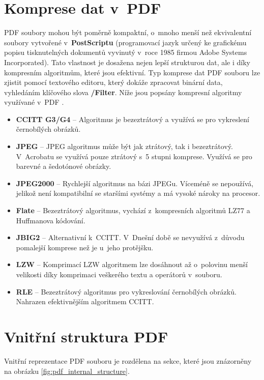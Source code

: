 \section{Komprese dat v~PDF}
\label{sec:komprese}
PDF soubory mohou být poměrně kompaktní, o~mnoho menší než ekvivalentní soubory vytvořené v~\textbf{PostScriptu} (programovací jazyk určený ke grafickému popisu tisknutelných dokumentů vyvinutý v~roce 1985 firmou Adobe Systems Incorporated). Tato vlastnost je dosažena nejen lepší strukturou dat, ale i díky kompresním algoritmům, které jsou efektivní. Typ komprese dat PDF souboru lze zjistit pomocí textového editoru, který dokáže zpracovat binární data, vyhledáním klíčového slova \textbf{/Filter}. Níže jsou popsány kompresní algoritmy využívané v~PDF \cite{PDFPrepressure}.
\begin{itemize}
	\item \textbf{CCITT G3/G4} -- Algoritmus je bezeztrátový a využívá se pro vykreslení černobílých obrázků.
	\item \textbf{JPEG} -- JPEG algoritmus může být jak ztrátový, tak i bezeztrátový. V~Acrobatu se využívá pouze ztrátový s~5 stupni komprese. Využívá se pro barevné a šedotónové obrázky.
	\item \textbf{JPEG2000} -- Rychlejší algoritmus na bázi JPEGu. Víceméně se nepoužívá, jelikož není kompatibilní se staršími systémy a má vysoké nároky na procesor.
	\item \textbf{Flate} -- Bezeztrátový algoritmus, vychází z~kompresních algoritmů LZ77 a Huffmanova kódování.
	\item \textbf{JBIG2} -- Alternativní k~CCITT. V~Dnešní době se nevyužívá z~důvodu pomalejší komprese než je u~jeho protějšku.
	\item \textbf{LZW} -- Komprimací LZW algoritmem lze dosáhnout až o~polovinu menší velikosti díky komprimaci veškerého textu a operátorů v~souboru.
	\item \textbf{RLE} -- Bezeztrátový algoritmus pro vykreslování černobílých obrázků. Nahrazen efektivnějším algoritmem CCITT.
\end{itemize}

\section{Vnitřní struktura PDF}
Vnitřní reprezentace PDF souboru je rozdělena na sekce, které jsou znázorněny na obrázku \ref{fig:pdf_internal_structure}.

